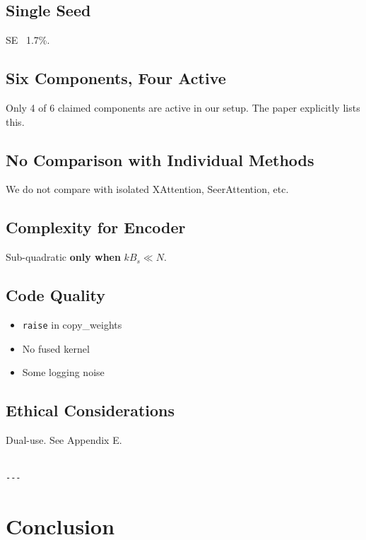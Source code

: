 \subsection{Single Seed}

SE ~1.7\%.

\subsection{Six Components, Four Active}

Only 4 of 6 claimed components are active in our setup. The paper 
explicitly lists this.

\subsection{No Comparison with Individual Methods}

We do not compare with isolated XAttention, SeerAttention, etc.

\subsection{Complexity for Encoder}

Sub-quadratic \textbf{only when} $k B_s \ll N$.

\subsection{Code Quality}

\begin{itemize}
\item \texttt{raise} in copy\_weights
\item No fused kernel
\item Some logging noise

\end{itemize}
\subsection{Ethical Considerations}

Dual-use. See Appendix E.
\begin{lstlisting}

---
\end{lstlisting}

\section{Conclusion}

